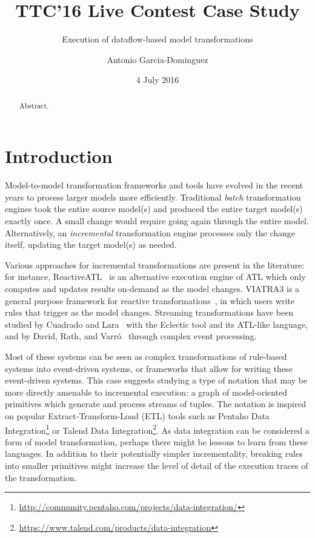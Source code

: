 \documentclass[a4paper]{scrartcl}
\title{TTC'16 Live Contest Case Study}
\subtitle{Execution of dataflow-based model transformations}
\author{Antonio Garcia-Dominguez}
\affil{\small Aston University, Birmingham, UK \\ \texttt{a.garcia-dominguez@aston.ac.uk}}
\date{4 July 2016}
\begin{document}
\maketitle

\begin{abstract}
  Abstract.
\end{abstract}

\section{Introduction}
\label{sec:intro}

Model-to-model transformation frameworks and tools have evolved in the
recent years to process larger models more efficiently. Traditional
\emph{batch} transformation engines took the entire source model(s)
and produced the entire target model(s) exactly once. A small change
would require going again through the entire model. Alternatively, an
\emph{incremental} transformation engine processes only the change
itself, updating the target model(s) as needed.

Various approaches for incremental transformations are present in the
literature: for instance, ReactiveATL~\cite{tisi_lazy_2011} is an
alternative execution engine of ATL which only computes and updates
results on-demand as the model changes. VIATRA3 is a general purpose
framework for reactive transformations~\cite{bergmann_viatra_2015}, in
which users write rules that trigger as the model changes.
Streaming transformations have been studied by Cuadrado and
Lara~\cite{cuadrado_streaming_2013} with the Eclectic tool and its
ATL-like language, and by David, Rath, and
Varró~\cite{david_streaming_2014} through complex event processing.

Most of these systems can be seen as complex transformations of
rule-based systems into event-driven systems, or frameworks that allow
for writing these event-driven systems. This case suggests studying a
type of notation that may be more directly amenable to incremental
execution: a graph of model-oriented primitives which generate and
process streams of tuples. The notation is inspired on popular
Extract-Transform-Load (ETL) tools such as Pentaho Data
Integration\footnote{\url{http://community.pentaho.com/projects/data-integration/}}
or Talend Data
Integration\footnote{\url{https://www.talend.com/products/data-integration}}. As
data integration can be considered a form of model transformation,
perhaps there might be lessons to learn from these languages. In
addition to their potentially simpler incrementality, breaking rules
into smaller primitives might increase the level of detail of the
execution traces of the transformation.
\end{document}
